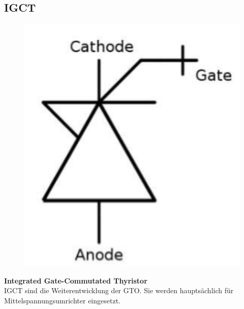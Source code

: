 \begin{minipage}{0.5\linewidth}
    \subsection{IGCT}
    	        \begin{figure}
    	        	\vspace{-1cm}
    	\includegraphics[width=\linewidth]{images/IGCTSymbol}
    \end{figure} 
    \begin{minipage}{\linewidth}
        \textbf{Integrated Gate-Commutated Thyristor}\\
        IGCT sind die Weiterentwicklung der GTO.\newline
        Sie werden hauptsächlich für Mittel\-spannungs\-umrichter eingesetzt.
    \end{minipage}
\end{minipage}
\clearpage

